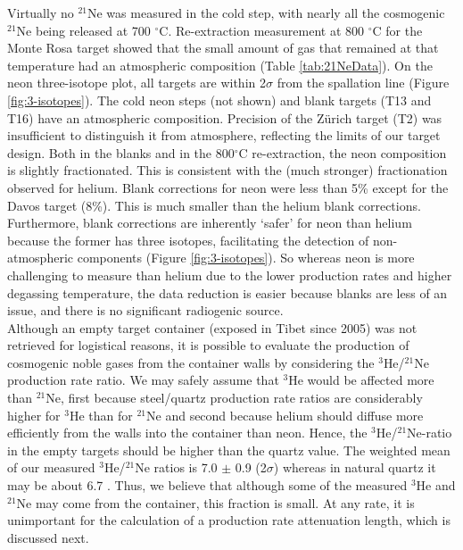 \documentclass{article}
\begin{document}
Virtually no $^{21}$Ne was measured  in the cold step, with nearly all
the   cosmogenic  $^{21}$Ne   being  released   at   700  $^{\circ}$C.
Re-extraction measurement at 800 $^{\circ}$C for the Monte Rosa target
showed that the small amount  of gas that remained at that temperature
had  an atmospheric  composition (Table  \ref{tab:21NeData}).   On the
neon  three-isotope plot, all  targets are  within 2$\sigma$  from the
spallation  line (Figure \ref{fig:3-isotopes}).   The cold  neon steps
(not  shown) and  blank  targets  (T13 and  T16)  have an  atmospheric
composition.  Precision of the Z\"{u}rich target (T2) was insufficient
to distinguish it from atmosphere, reflecting the limits of our target
design. Both  in the blanks  and in the  800$^{\circ}$C re-extraction,
the neon composition is slightly fractionated. This is consistent with
the  (much   stronger)  fractionation  observed   for  helium.   Blank
corrections for  neon were less than  5\% except for  the Davos target
(8\%).  This  is  much  smaller  than the  helium  blank  corrections.
Furthermore, blank  corrections are  inherently `safer' for  neon than
helium  because  the  former  has  three  isotopes,  facilitating  the
detection of non-atmospheric components (Figure \ref{fig:3-isotopes}).
So whereas neon is more challenging  to measure than helium due to the
lower  production rates  and  higher degassing  temperature, the  data
reduction is easier because blanks are  less of an issue, and there is
no significant radiogenic source.  \\

Although an empty  target container (exposed in Tibet  since 2005) was
not retrieved for  logistical reasons, it is possible  to evaluate the
production  of cosmogenic  noble  gases from  the  container walls  by
considering the $^3$He/$^{21}$Ne production rate ratio.  We may safely
assume  that  $^3$He would  be  affected  more  than $^{21}$Ne,  first
because  steel/quartz production rate  ratios are  considerably higher
for $^3$He than for $^{21}$Ne and second because helium should diffuse
more efficiently from the walls  into the container than neon.  Hence,
the $^3$He/$^{21}$Ne-ratio in the  empty targets should be higher than
the quartz value.  The  weighted mean of our measured $^3$He/$^{21}$Ne
ratios is 7.0  $\pm$ 0.9 (2$\sigma$) whereas in  natural quartz it may
be about 6.7 \citep{masarik1995}.  Thus, we believe that although some
of the  measured $^{3}$He and  $^{21}$Ne may come from  the container,
this  fraction is  small.   At any  rate,  it is  unimportant for  the
calculation  of  a  production   rate  attenuation  length,  which  is
discussed next.
\end{document}
